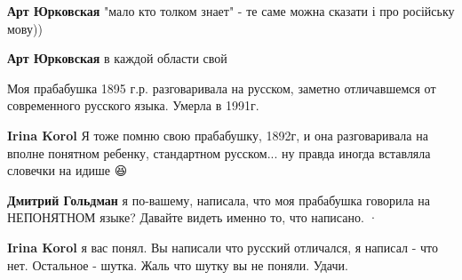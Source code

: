 \begin{itemize}
\begin{itemize}
\textbf{Арт Юрковская} "мало кто толком знает" - те саме можна сказати і про російську мову))


 
\textbf{Арт Юрковская} в каждой области свой

\end{itemize}

 

Моя прабабушка 1895 г.р. разговаривала на русском, заметно отличавшемся от
современного русского языка. Умерла в 1991г.

\begin{itemize}
 
\textbf{Irina Korol} Я тоже помню свою прабабушку, 1892г, и она разговаривала
на вполне понятном ребенку, стандартном русском... ну правда иногда вставляла
словечки на идише 😆

\begin{itemize}
 
\textbf{Дмитрий Гольдман} я по-вашему, написала, что моя прабабушка говорила на
НЕПОНЯТНОМ языке? Давайте видеть именно то, что написано.  · 


 
\textbf{Irina Korol} я вас понял. Вы написали что русский отличался, я написал
- что нет. Остальное - шутка. Жаль что шутку вы не поняли. Удачи.
\end{itemize}


\end{itemize}
\end{itemize}
